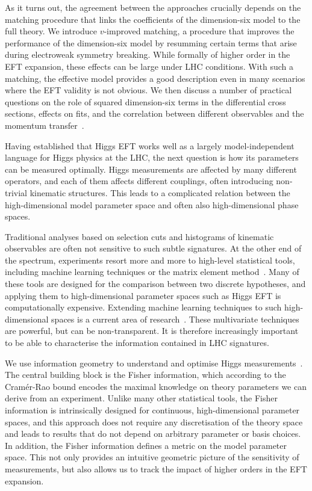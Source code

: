 As it turns out, the agreement between the approaches crucially
depends on the matching procedure that links the coefficients of the
dimension-six model to the full theory. We introduce $v$-improved
matching, a procedure that improves the performance of the dimension-six
model by resumming certain terms that arise during electroweak
symmetry breaking. While formally of higher order in the EFT
expansion, these effects can be large under LHC conditions. With such
a matching, the effective model provides a good description even in
many scenarios where the EFT validity is not obvious. We then discuss
a number of practical questions on the role of squared dimension-six
terms in the differential cross sections, effects on fits, and the
correlation between different observables and the momentum
transfer~\cite{Biekotter:2016ecg}.

\newparagraph
%
Having established that Higgs EFT works well as a largely
model-independent language for Higgs physics at the LHC, the
next question is how its parameters can be measured optimally. Higgs
measurements are affected by many different operators, and each of
them affects different couplings, often introducing non-trivial
kinematic structures. This leads to a complicated relation between the
high-dimensional model parameter space and often also high-dimensional
phase spaces.

Traditional analyses based on selection cuts and histograms of
kinematic observables are often not sensitive to such subtle signatures.
At the other end of the spectrum, experiments resort more and more to
high-level statistical tools, including machine learning techniques or
the matrix element method~\cite{Kondo:1988yd, Atwood:1991ka,
  Gao:2010qx, Bolognesi:2012mm, Cranmer:2015nia}. Many of these tools
are designed for the comparison between two discrete hypotheses, and
applying them to high-dimensional parameter spaces such as Higgs EFT
is computationally expensive. Extending machine learning techniques to
such high-dimensional spaces is a current area of
research~\cite{Cranmer:2015bka}. These multivariate techniques are
powerful, but can be non-transparent. It is therefore increasingly
important to be able to characterise the information contained in LHC
signatures.

We use information geometry to understand and optimise Higgs
measurements~\cite{Brehmer:2016nyr}.  The central building block is
the Fisher information, which according to the Cram\'er-Rao bound
encodes the maximal knowledge on theory parameters we can derive from
an experiment. Unlike many other statistical tools, the Fisher
information is intrinsically designed for continuous, high-dimensional
parameter spaces, and this approach does not require any
discretisation of the theory space and leads to results that do not
depend on arbitrary parameter or basis choices. In addition, the
Fisher information defines a metric on the model parameter space. This
not only provides an intuitive geometric picture of the sensitivity of
measurements, but also allows us to track the impact of higher
orders in the EFT expansion.

